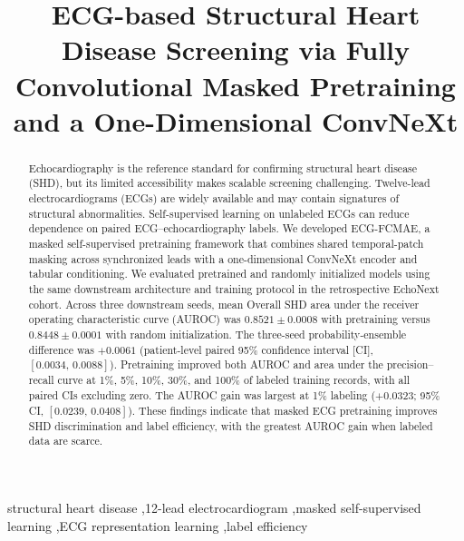 \documentclass[final,5p,times,twocolumn,nonatbib]{elsarticle}
\begin{document}
\begin{frontmatter}

\title{ECG-based Structural Heart Disease Screening via Fully Convolutional Masked Pretraining and a One-Dimensional ConvNeXt}

\begin{abstract}
Echocardiography is the reference standard for confirming structural heart disease (SHD), but its limited accessibility makes scalable screening challenging. Twelve-lead electrocardiograms (ECGs) are widely available and may contain signatures of structural abnormalities. Self-supervised learning on unlabeled ECGs can reduce dependence on paired ECG--echocardiography labels. We developed ECG-FCMAE, a masked self-supervised pretraining framework that combines shared temporal-patch masking across synchronized leads with a one-dimensional ConvNeXt encoder and tabular conditioning. We evaluated pretrained and randomly initialized models using the same downstream architecture and training protocol in the retrospective EchoNext cohort. Across three downstream seeds, mean Overall SHD area under the receiver operating characteristic curve (AUROC) was $0.8521\pm0.0008$ with pretraining versus $0.8448\pm0.0001$ with random initialization. The three-seed probability-ensemble difference was $+0.0061$ (patient-level paired 95\% confidence interval [CI], $[0.0034,\,0.0088]$). Pretraining improved both AUROC and area under the precision--recall curve at 1\%, 5\%, 10\%, 30\%, and 100\% of labeled training records, with all paired CIs excluding zero. The AUROC gain was largest at 1\% labeling ($+0.0323$; 95\% CI, $[0.0239,\,0.0408]$). These findings indicate that masked ECG pretraining improves SHD discrimination and label efficiency, with the greatest AUROC gain when labeled data are scarce.
\end{abstract}

\begin{keyword}
structural heart disease \sep 12-lead electrocardiogram \sep masked self-supervised learning \sep ECG representation learning \sep label efficiency
\end{keyword}

\end{frontmatter}
\raggedbottom



\BSPCprintbibliography
\end{document}
